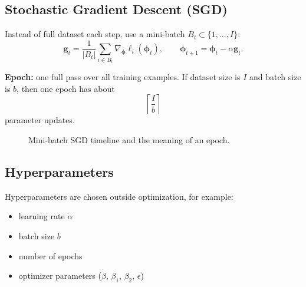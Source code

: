 \subsection{Stochastic Gradient Descent (SGD)}
Instead of full dataset each step, use a mini-batch $B_t\subset\{1,\dots,I\}$:
\[
\mathbf{g}_t
=
\frac{1}{|B_t|}
\sum_{i\in B_t}\nabla_{\boldsymbol{\phi}}\ell_i(\boldsymbol{\phi}_t),
\qquad
\boldsymbol{\phi}_{t+1}=\boldsymbol{\phi}_t-\alpha\mathbf{g}_t.
\]

\textbf{Epoch:} one full pass over all training examples.
If dataset size is $I$ and batch size is $b$, then one epoch has about
\[
\left\lceil\frac{I}{b}\right\rceil
\]
parameter updates.

\begin{figure}[h!]
\centering
{}
\caption{Mini-batch SGD timeline and the meaning of an epoch.}
\end{figure}

\subsection{Hyperparameters}
Hyperparameters are chosen outside optimization, for example:
\begin{itemize}
    \item learning rate $\alpha$
    \item batch size $b$
    \item number of epochs
    \item optimizer parameters ($\beta$, $\beta_1$, $\beta_2$, $\epsilon$)
\end{itemize}

